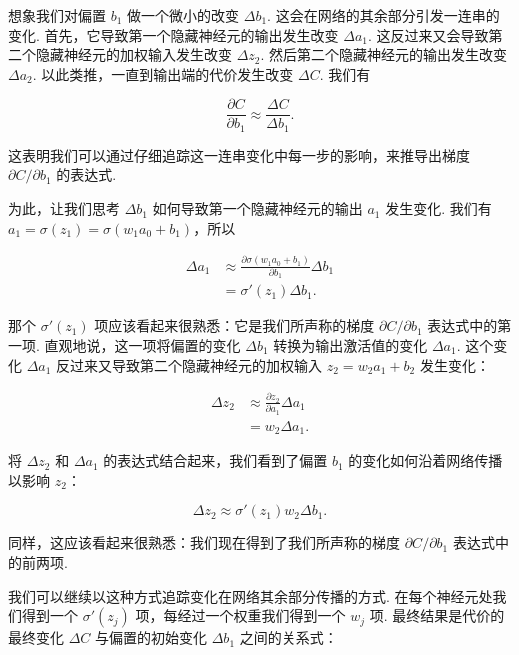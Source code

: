 想象我们对偏置 $b_1$ 做一个微小的改变 $\Delta b_1$. 这会在网络的其余部分引发一连串的变化. 首先，它导致第一个隐藏神经元的输出发生改变 $\Delta a_1$. 这反过来又会导致第二个隐藏神经元的加权输入发生改变 $\Delta z_2$. 然后第二个隐藏神经元的输出发生改变 $\Delta a_2$. 以此类推，一直到输出端的代价发生改变 $\Delta C$. 我们有

\begin{equation}
\frac{\partial C}{\partial b_1} \approx \frac{\Delta C}{\Delta b_1}.
\tag{114}
\end{equation}

\noindent 这表明我们可以通过仔细追踪这一连串变化中每一步的影响，来推导出梯度 $\partial C / \partial b_1$ 的表达式.

为此，让我们思考 $\Delta b_1$ 如何导致第一个隐藏神经元的输出 $a_1$ 发生变化. 我们有 $a_1 = \sigma(z_1) = \sigma(w_1 a_0 + b_1)$，所以

\begin{align}
\Delta a_1 &\approx \frac{\partial \sigma(w_1 a_0+b_1)}{\partial b_1} \Delta b_1 \tag{115} \\ &= \sigma'(z_1) \Delta b_1. \tag{116}
\end{align}

\noindent 那个 $\sigma'(z_1)$ 项应该看起来很熟悉：它是我们所声称的梯度 $\partial C / \partial b_1$ 表达式中的第一项. 直观地说，这一项将偏置的变化 $\Delta b_1$ 转换为输出激活值的变化 $\Delta a_1$. 这个变化 $\Delta a_1$ 反过来又导致第二个隐藏神经元的加权输入 $z_2 = w_2 a_1 + b_2$ 发生变化：

\begin{align}
\Delta z_2 &\approx \frac{\partial z_2}{\partial a_1} \Delta a_1 \tag{117} \\ &= w_2 \Delta a_1. \tag{118}
\end{align}

\noindent 将 $\Delta z_2$ 和 $\Delta a_1$ 的表达式结合起来，我们看到了偏置 $b_1$ 的变化如何沿着网络传播以影响 $z_2$：

\begin{equation}
\Delta z_2 \approx \sigma'(z_1) w_2 \Delta b_1.
\tag{119}
\end{equation}

\noindent 同样，这应该看起来很熟悉：我们现在得到了我们所声称的梯度 $\partial C / \partial b_1$ 表达式中的前两项.

我们可以继续以这种方式追踪变化在网络其余部分传播的方式. 在每个神经元处我们得到一个 $\sigma'(z_j)$ 项，每经过一个权重我们得到一个 $w_j$ 项. 最终结果是代价的最终变化 $\Delta C$ 与偏置的初始变化 $\Delta b_1$ 之间的关系式：

